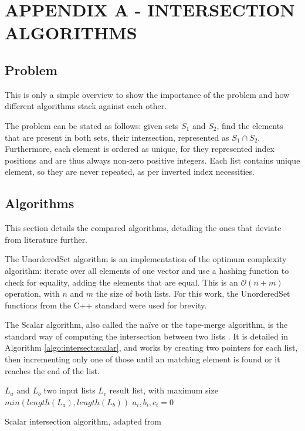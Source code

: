 
\hypertarget{appendix:a}{} %
\renewcommand{\thechapter}{}%
\chapter{APPENDIX A - INTERSECTION ALGORITHMS}
\label{ap:a}
\renewcommand{\thechapter}{A}

\section{Problem}\label{ap:a:problem}

This is only a simple overview to show the importance of the problem and how different algorithms stack against each other.

The problem can be stated as follows: given sets $S_1$ and $S_2$, find the elements that are present in both sets, their intersection, represented as $S_1 \cap S_2$.
Furthermore, each element is ordered as unique, for they represented index positions and are thus always non-zero positive integers.
Each list contains unique element, so they are never repeated, as per inverted index necessities.

\section{Algorithms}\label{ap:a:algos}

This section details the compared algorithms, detailing the ones that deviate from literature further.

The UnorderedSet algorithm is an implementation of the optimum complexity algorithm: iterate over all elements of one vector and use a hashing function to check for equality, adding the elements that are equal.
This is an $\mathcal{O}(n+m)$ operation, with $n$ and $m$ the size of both lists.
For this work, the UnorderedSet functions from the C++ standard were used for brevity.

The Scalar algorithm, also called the naïve or the tape-merge algorithm, is the standard way of computing the intersection between two lists \cite{hwangSimpleAlgorithmMerging1972}.
It is detailed in Algorithm \ref{algo:intersect:scalar}, and works by creating two pointers for each list, then incrementing only one of those until an matching element is found or it reaches the end of the list.

\begin{algorithm}[!htb]
\SetAlgoLined
{}
 $L_a$ and $L_b$ two input lists\;
 $L_c$ result list, with maximum size $min(length(L_a), length(L_b))$\;
 $a_i, b_i, c_i = 0$\;
 \;
 \caption{Scalar intersection algorithm, adapted from \cite{hwangSimpleAlgorithmMerging1972}}\label{algo:intersect:scalar}
\end{algorithm}

